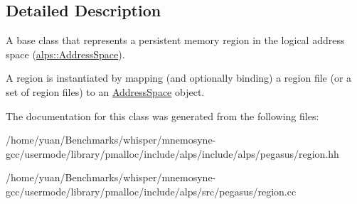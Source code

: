 \subsection{Detailed Description}
A base class that represents a persistent memory region in the logical address space (\hyperlink{classalps_1_1AddressSpace}{alps\+::\+Address\+Space}).

A region is instantiated by mapping (and optionally binding) a region file (or a set of region files) to an \hyperlink{classalps_1_1AddressSpace}{Address\+Space} object. 

The documentation for this class was generated from the following files\+:\begin{DoxyCompactItemize}
\item 
/home/yuan/\+Benchmarks/whisper/mnemosyne-\/gcc/usermode/library/pmalloc/include/alps/include/alps/pegasus/region.\+hh\item 
/home/yuan/\+Benchmarks/whisper/mnemosyne-\/gcc/usermode/library/pmalloc/include/alps/src/pegasus/region.\+cc\end{DoxyCompactItemize}
